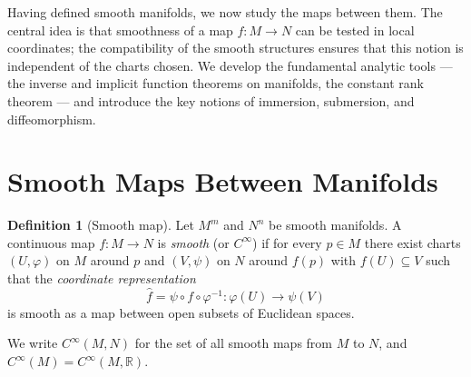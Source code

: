 \documentclass[12pt,a4paper,openany]{book}
\theoremstyle{definition}
\newtheorem{definition}[theorem]{Definition}
\theoremstyle{remark}
\newcommand{\R}{\mathbb{R}}
\begin{document}
\noindent
Having defined smooth manifolds, we now study the maps between them.  The
central idea is that smoothness of a map $f \colon M \to N$ can be tested
in local coordinates; the compatibility of the smooth structures ensures
that this notion is independent of the charts chosen.  We develop the
fundamental analytic tools --- the inverse and implicit function theorems
on manifolds, the constant rank theorem --- and introduce the key notions
of immersion, submersion, and diffeomorphism.

\section{Smooth Maps Between Manifolds}
\label{sec:smooth-maps}

\begin{definition}[Smooth map]\label{def:smooth-map}
Let $M^m$ and $N^n$ be smooth manifolds.  A continuous map
$f \colon M \to N$ is \emph{smooth} (or $C^\infty$) if for every
$p \in M$ there exist charts $(U,\varphi)$ on $M$ around $p$ and
$(V,\psi)$ on $N$ around $f(p)$ with $f(U) \subseteq V$ such that the
\emph{coordinate representation}
\[
  \hat{f} = \psi \circ f \circ \varphi^{-1}
  \colon \varphi(U) \longrightarrow \psi(V)
\]
is smooth as a map between open subsets of Euclidean spaces.

We write $C^\infty(M,N)$ for the set of all smooth
maps from $M$ to $N$, and $C^\infty(M) = C^\infty(M,\R)$.
\end{definition}

\end{document}
